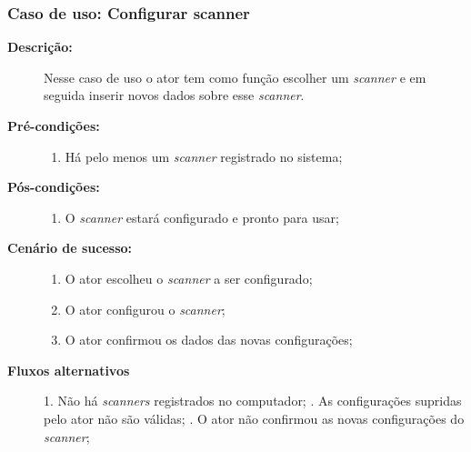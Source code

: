 \subsubsection{Caso de uso: Configurar scanner}
\begin{description}
    \item[{\bf Descrição:}] Nesse caso de uso o ator tem como função escolher um {\it scanner} e em seguida inserir novos dados sobre esse {\it scanner}.
    \item[{\bf Pré-condições:}]
        \begin{enumerate}
            \item Há pelo menos um {\it scanner} registrado no sistema;
        \end{enumerate}
    \item[{\bf Pós-condições:}] 
        \begin{enumerate}
            \item O {\it scanner} estará configurado e pronto para usar;
        \end{enumerate}
    
    \item[{\bf Cenário de sucesso:}]
        \begin{enumerate}
            \item O ator escolheu o  {\it scanner} a ser configurado;
            \item O ator configurou o {\it scanner};
            \item O ator confirmou os dados das novas configurações;
        \end{enumerate}

    \item[{\bf Fluxos alternativos}]
        1. Não há {\it scanners} registrados no computador; . As configurações supridas pelo ator não são válidas; . O ator não confirmou as novas configurações do {\it scanner};
\end{description}
